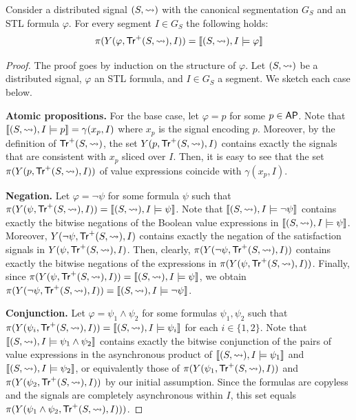 \begin{lemma} \label{cl:eq}
	Consider a distributed signal $(S,{\rightsquigarrow})$ with the canonical segmentation $G_S$ and an STL formula $\varphi$.
	For every segment $I \in G_S$ the following holds:
	\[ \pi(Y(\varphi, \mathsf{Tr}^+(S,{\rightsquigarrow}), I)) = \llbracket (S,{\rightsquigarrow}), I \models \varphi \rrbracket \]
\end{lemma}
\begin{proof}
	The proof goes by induction on the structure of $\varphi$.
	Let $(S,{\rightsquigarrow})$ be a distributed signal, $\varphi$ an STL formula, and $I \in G_S$ a segment.
	We sketch each case below.
	
	\noindent\textbf{Atomic propositions.}
	For the base case, let $\varphi = p$ for some $p \in \mathsf{AP}$.
	Note that $\llbracket (S, {\rightsquigarrow}), I \models p \rrbracket = \gamma(x_p, I)$ where $x_p$ is the signal encoding $p$.
	Moreover, by the definition of $\mathsf{Tr}^+(S,{\rightsquigarrow})$, the set $Y(p, \mathsf{Tr}^+(S,{\rightsquigarrow}), I)$ contains exactly the signals that are consistent with $x_p$ sliced over $I$.
	Then, it is easy to see that the set $\pi(Y(p, \mathsf{Tr}^+(S,{\rightsquigarrow}), I))$ of value expressions coincide with $\gamma(x_p, I)$.
	
	\noindent\textbf{Negation.}
	Let $\varphi = \lnot \psi$ for some formula $\psi$ such that $\pi(Y(\psi, \mathsf{Tr}^+(S,{\rightsquigarrow}), I)) = \llbracket (S,{\rightsquigarrow}), I \models \psi \rrbracket$.
	Note that $\llbracket (S,{\rightsquigarrow}), I \models \lnot \psi \rrbracket$ contains exactly the bitwise negations of the Boolean value expressions in $\llbracket (S,{\rightsquigarrow}), I \models \psi \rrbracket$.
	Moreover, $Y(\lnot\psi, \mathsf{Tr}^+(S,{\rightsquigarrow}), I)$ contains exactly the negation of the satisfaction signals in $Y(\psi, \mathsf{Tr}^+(S,{\rightsquigarrow}), I)$.
	Then, clearly, $\pi(Y(\lnot\psi, \mathsf{Tr}^+(S,{\rightsquigarrow}), I))$ contains exactly the bitwise negations of the expressions in $\pi(Y(\psi, \mathsf{Tr}^+(S,{\rightsquigarrow}), I))$.
	Finally, since $\pi(Y(\psi, \mathsf{Tr}^+(S,{\rightsquigarrow}), I)) = \llbracket (S,{\rightsquigarrow}), I \models \psi \rrbracket$, we obtain $\pi(Y(\lnot\psi, \mathsf{Tr}^+(S,{\rightsquigarrow}), I)) = \llbracket (S,{\rightsquigarrow}), I \models \lnot\psi \rrbracket$.
	
	\noindent\textbf{Conjunction.}
	Let $\varphi = \psi_1 \land \psi_2$ for some formulas $\psi_1, \psi_2$ such that $\pi(Y(\psi_i, \mathsf{Tr}^+(S,{\rightsquigarrow}), I)) = \llbracket (S,{\rightsquigarrow}), I \models \psi_i \rrbracket$ for each $i \in \{1,2\}$.
	Note that $\llbracket (S,{\rightsquigarrow}), I \models \psi_1 \land \psi_2 \rrbracket$ contains exactly the bitwise conjunction of the pairs of value expressions in the asynchronous product of $\llbracket (S,{\rightsquigarrow}), I \models \psi_1 \rrbracket$ and $\llbracket (S,{\rightsquigarrow}), I \models \psi_2 \rrbracket$, or equivalently those of $\pi(Y(\psi_1, \mathsf{Tr}^+(S,{\rightsquigarrow}), I))$ and $\pi(Y(\psi_2, \mathsf{Tr}^+(S,{\rightsquigarrow}), I))$ by our initial assumption.
	Since the formulas are copyless and the signals are completely asynchronous within $I$, this set equals $\pi(Y(\psi_1 \land \psi_2, \mathsf{Tr}^+(S,{\rightsquigarrow}), I)))$.
	

\end{proof}
